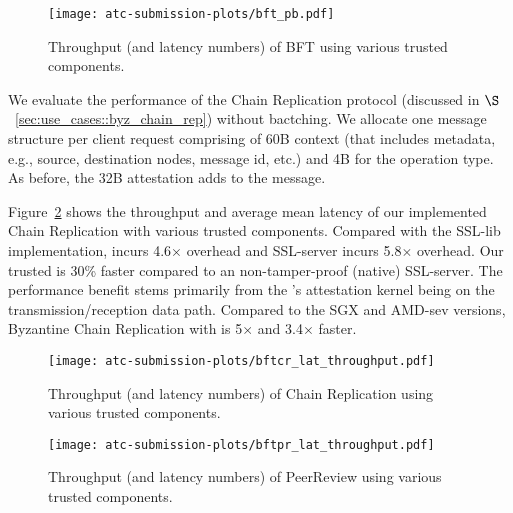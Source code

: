 \begin{figure}[t!]
    \centering
    \texttt{[image: atc-submission-plots/bft\_pb.pdf]} 
    \caption{Throughput (and latency numbers) of BFT using various trusted components.} \label{fig:byz_smr_throuthput}
\end{figure}



 We evaluate the performance of the Chain Replication protocol (discussed in $\S$~\ref{sec:use_cases::byz_chain_rep}) without bactching. %
We allocate one message structure per client request comprising of 60B context (that includes metadata, e.g., source, destination nodes, message id, etc.) and  4B for the operation type. As before, the 32B attestation  adds to the message. %

 Figure~\ref{fig:byz_chain_replication} shows the throughput and average mean latency of our implemented Chain Replication with various trusted components. Compared with the SSL-lib implementation, \projecttitle{} incurs 4.6$\times$ overhead and SSL-server incurs 5.8$\times$ overhead. Our trusted \projecttitle{} is 30\% faster compared to an non-tamper-proof (native) SSL-server. The performance benefit stems primarily from the \projecttitle{}'s attestation kernel being on the transmission/reception data path.
Compared to the SGX and AMD-sev versions, Byzantine Chain Replication with \projecttitle{} is 5$\times$ and 3.4$\times$ faster.
\begin{figure}
    \centering
  \texttt{[image: atc-submission-plots/bftcr\_lat\_throughput.pdf]} 
    \caption{Throughput (and latency numbers) of Chain Replication using various trusted components.} \label{fig:byz_chain_replication}
\end{figure}

\begin{figure}
  \texttt{[image: atc-submission-plots/bftpr\_lat\_throughput.pdf]} 
    \caption{Throughput (and latency numbers) of PeerReview using various trusted components.} \label{fig:accountability_protocol}
\end{figure}

